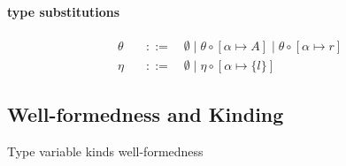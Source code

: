 \paragraph{\textnormal{\textbf{\vlmini{} type substitutions}}}
\begin{align*}
\theta \quad&::=\quad \emptyset \mid \theta \circ [\alpha \mapsto A] \mid \theta \circ [\alpha \mapsto r] \tag{type substitutions}\\
\eta   \quad&::=\quad \emptyset \mid \eta\circ[\alpha \mapsto \{l\}] \tag{label substituions} 
\end{align*}







\subsection{\vlmini{} Well-formedness and Kinding}
\begin{rules}{Type variable kinds well-formedness}{\vdash \Sigma}
    \begin{minipage}{.25\linewidth}
        \infrule[Kw$_\emptyset$]{
            \\
        }{
            \vdash \emptyset
        }
    \end{minipage}
    \begin{minipage}{.70\linewidth}
    \end{minipage}
\end{rules}

